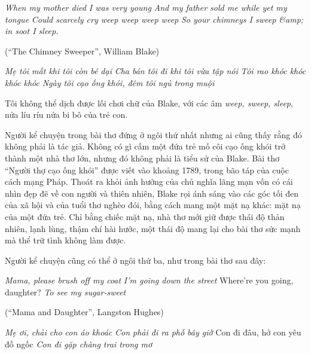 \documentclass[../main.tex]{subfiles}
\begin{document}
\begin{multicols}{2}
\begin{blockquote}
\textit{When my mother died I was very young}        
\textit{And my father sold me while yet my tongue}        
\textit{Could scarcely cry weep weep weep weep}        
\textit{So your chimneys I sweep &amp; in soot I sleep.}        
        
(“The Chimney Sweeper”, William Blake) 
        
\textit{Mẹ tôi mất khi tôi còn bé dại}        
\textit{Cha bán tôi đi khi tôi vừa tập nói}        
\textit{Tôi rao khóc khóc khóc khóc} 
\textit{Ngày tôi cạo ống khói, đêm tôi ngủ trong muội} 

\end{blockquote}
 
Tôi không thể dịch được lối chơi chữ của Blake, với các âm \textit{weep, sweep, sleep}, nửa líu ríu nửa bi bô của trẻ con.  
 
Người kể chuyện trong bài thơ đứng ở ngôi thứ nhất nhưng ai cũng thấy rằng đó không phải là tác giả. Không có gì cấm một đứa trẻ mố côi cạo ống khói trở thành một nhà thơ lớn, nhưng đó không phải là tiểu sử của Blake. Bài thơ “Người thợ cạo ống khói” được viết vào khoảng 1789, trong bão táp của cuộc cách mạng Pháp. Thoát ra khỏi ảnh hưởng của chủ nghĩa lãng mạn vốn có cái nhìn đẹp đẽ về con người và thiên nhiên, Blake rọi ánh sáng vào các góc tối đen của xã hội và của tuổi thơ nghèo đói, bằng cách mang một mặt nạ khác: mặt nạ của một đứa trẻ. Chỉ bằng chiếc mặt nạ, nhà thơ mới giữ được thái độ thản nhiên, lạnh lùng, thậm chí hài hước, một thái độ mang lại cho bài thơ sức mạnh mà thể trữ tình không làm được.  
 
Người kể chuyện cũng có thể ở ngôi thứ ba, như trong bài thơ sau đây:         
\begin{blockquote}
        
\textit{Mama, please brush off my coat}        
\textit{I’m going down the street}        
Where’re you going, daughter?        
\textit{To see my sugar-sweet}        
        
(“Mama and Daughter”, Langston Hughes) 
        
\textit{Mẹ ơi, chải cho con áo khoác }        
\textit{Con phải đi ra phố bây giờ}        
Con đi đâu, hở con yêu đồ ngốc 
\textit{Con đi gặp chàng trai trong mơ} 

\end{blockquote}
 

\end{multicols}
\end{document}
